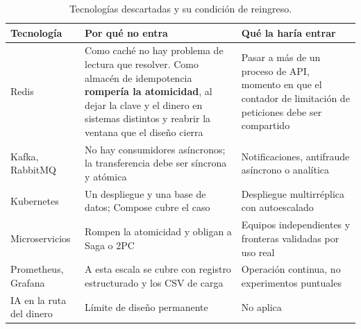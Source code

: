 \begin{table}[htbp]
\centering
\caption{Tecnologías descartadas y su condición de reingreso.}
\label{tab:descartes}
\scriptsize
\begin{tabularx}{\textwidth}{@{}lXX@{}}
\toprule
\textbf{Tecnología} & \textbf{Por qué no entra} & \textbf{Qué la haría entrar} \\
\midrule
Redis & Como caché no hay problema de lectura que resolver. Como almacén de
  idempotencia \textbf{rompería la atomicidad}, al dejar la clave y el dinero
  en sistemas distintos y reabrir la ventana que el diseño cierra &
  Pasar a más de un proceso de API, momento en que el contador de limitación
  de peticiones debe ser compartido \\
Kafka, RabbitMQ & No hay consumidores asíncronos; la transferencia debe ser
  síncrona y atómica &
  Notificaciones, antifraude asíncrono o analítica \\
Kubernetes & Un despliegue y una base de datos; Compose cubre el caso &
  Despliegue multirréplica con autoescalado \\
Microservicios & Rompen la atomicidad y obligan a Saga o 2PC~\cite{fowler2015} &
  Equipos independientes y fronteras validadas por uso real \\
Prometheus, Grafana & A esta escala se cubre con registro estructurado y los
  CSV de carga & Operación continua, no experimentos puntuales \\
IA en la ruta del dinero & Límite de diseño permanente & No aplica \\
\bottomrule
\end{tabularx}
\end{table}
